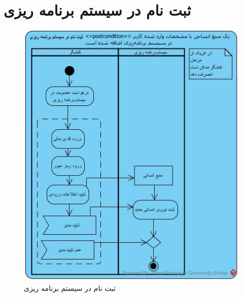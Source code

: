\section{ثبت نام در سیستم برنامه ریزی}
\begin{figure}[H]
	\centering
	\includegraphics[scale=0.9]{img/activity/SignUp}
	\caption{ثبت نام در سیستم برنامه ریزی}
\end{figure}

